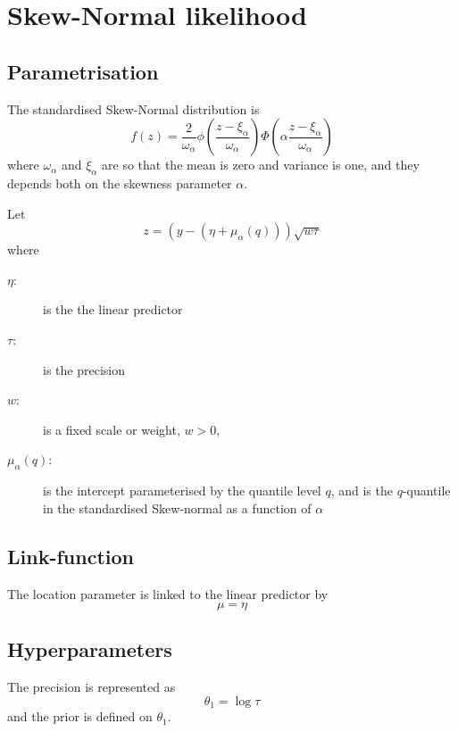 \documentclass[a4paper,11pt]{article}
\begin{document}
\section*{Skew-Normal likelihood}

\subsection*{Parametrisation}

The standardised Skew-Normal distribution is
\begin{displaymath}
    f(z) = \frac{2}{\omega_{\alpha}}
    \phi\left(\frac{z -\xi_{\alpha}}{\omega_{\alpha}}\right)
    \Phi\left(\alpha \frac{z -\xi_{\alpha}}{\omega_{\alpha}}\right)
\end{displaymath}
where $\omega_\alpha$ and $\xi_\alpha$ are so that the mean is zero
and variance is one, and they depends both on the skewness parameter
$\alpha$.

Let
\begin{displaymath}
    z= (y - (\eta + \mu_{\alpha}(q)))\sqrt{w \tau}
\end{displaymath}
where
\begin{description}
\item[$\eta$:] is the the linear predictor
\item[$\tau$:] is the precision
\item[$w$:] is a fixed scale or weight, $w>0$,
\item[$\mu_{\alpha}(q)$:] is the intercept parameterised by the
    quantile level $q$, and is the $q$-quantile in the standardised
    Skew-normal as a function of $\alpha$
\end{description}

\subsection*{Link-function}

The location parameter is linked to the linear predictor by
\begin{displaymath}
    \mu = \eta
\end{displaymath}

\subsection*{Hyperparameters}

The precision is represented as
\begin{displaymath}
    \theta_{1} = \log \tau
\end{displaymath}
and the prior is defined on $\theta_{1}$. 
\end{document}
